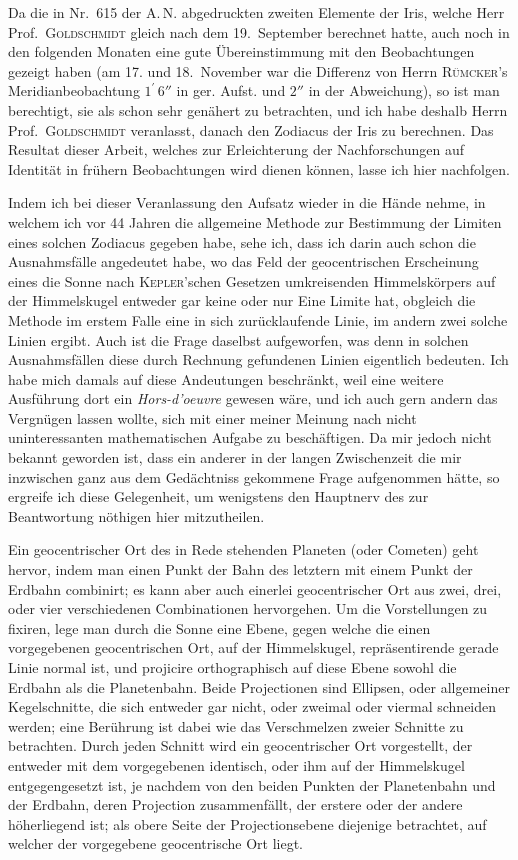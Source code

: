 \documentclass[11pt,a4paper]{book}
\begin{document}
Da die in Nr.~615 der A.\,N. abgedruckten zweiten Elemente der Iris, welche Herr Prof.~\textsc{Goldschmidt} gleich nach dem 19.~September berechnet hatte, auch noch in den folgenden Monaten eine gute Übereinstimmung mit den Beobachtungen gezeigt haben (am 17. und 18.~November war die Differenz von Herrn \textsc{Rümcker}'s Meridianbeobachtung $1^{\prime}\,6''$ in ger. Aufst. und $2''$ in der Abweichung), so ist man berechtigt, sie als schon sehr genähert zu betrachten, und ich habe deshalb Herrn Prof.~\textsc{Goldschmidt} veranlasst, danach den Zodiacus der Iris zu berechnen. Das Resultat dieser Arbeit, welches zur Erleichterung der Nachforschungen auf Identität in frühern Beobachtungen wird dienen können, lasse ich hier nachfolgen.

Indem ich bei dieser Veranlassung den Aufsatz wieder in die Hände nehme, in welchem ich vor 44 Jahren die allgemeine Methode zur Bestimmung der Limiten eines solchen Zodiacus gegeben habe, sehe ich, dass ich darin auch schon die Ausnahmsfälle angedeutet habe, wo das Feld der geocentrischen Erscheinung eines die Sonne nach \textsc{Kepler}'schen Gesetzen umkreisenden Himmelskörpers auf der Himmelskugel entweder gar keine oder nur Eine Limite hat, obgleich die Methode im erstem Falle eine in sich zurücklaufende Linie, im andern zwei solche Linien ergibt. Auch ist die Frage daselbst aufgeworfen, was denn in solchen Ausnahmsfällen diese durch Rechnung gefundenen Linien eigentlich bedeuten. Ich habe mich damals auf diese Andeutungen beschränkt, weil eine weitere Ausführung dort ein \textit{Hors-d'oeuvre} gewesen wäre, und ich auch gern andern das Vergnügen lassen wollte, sich mit einer meiner Meinung nach nicht uninteressanten mathematischen Aufgabe zu beschäftigen. Da mir jedoch nicht bekannt geworden ist, dass ein anderer in der langen Zwischenzeit die mir inzwischen ganz aus dem Gedächtniss gekommene Frage aufgenommen hätte, so ergreife ich diese Gelegenheit, um wenigstens den Hauptnerv des zur Beantwortung nöthigen hier mitzutheilen.

Ein geocentrischer Ort des in Rede stehenden Planeten (oder Cometen) geht hervor, indem man einen Punkt der Bahn des letztern mit einem Punkt der Erdbahn combinirt; es kann aber auch einerlei geocentrischer Ort aus zwei, drei, oder vier verschiedenen Combinationen hervorgehen. Um die Vorstellungen zu fixiren, lege man durch die Sonne eine Ebene, gegen welche die einen vorgegebenen geocentrischen Ort, auf der Himmelskugel, repräsentirende gerade Linie normal ist, und projicire orthographisch auf diese Ebene sowohl die Erdbahn als die Planetenbahn. Beide Projectionen sind Ellipsen, oder allgemeiner Kegelschnitte, die sich entweder gar nicht, oder zweimal oder viermal schneiden werden; eine Berührung ist dabei wie das Verschmelzen zweier Schnitte zu betrachten. Durch jeden Schnitt wird ein geocentrischer Ort vorgestellt, der entweder mit dem vorgegebenen identisch, oder ihm auf der Himmelskugel entgegengesetzt ist, je nachdem von den beiden Punkten der Planetenbahn und der Erdbahn, deren Projection zusammenfällt, der erstere oder der andere höherliegend ist; als obere Seite der Projectionsebene diejenige betrachtet, auf welcher der vorgegebene geocentrische Ort liegt.
\end{document}
